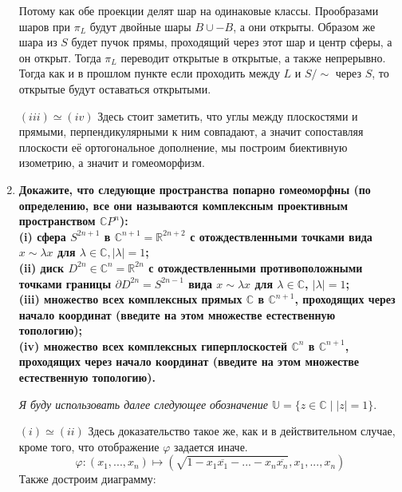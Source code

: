 \documentclass{article}
\begin{document}
\begin{enumerate}
        Потому как обе проекции делят шар на одинаковые классы. Прообразами
        шаров при $\pi_L$ будут двойные шары $B \cup -B$, а они
        открыты. Образом же шара из $S$ будет пучок прямы, проходящий через этот
        шар и центр сферы, а он открыт. Тогда $\pi_L$ переводит открытые в
        открытые, а также непрерывно. Тогда как и в прошлом пункте если
        проходить между $L$ и $S/\!\sim$ через $S$, то открытые будут оставаться
        открытыми.

        $(iii)\simeq(iv)$ Здесь стоит заметить, что углы между плоскостями и
        прямыми, перпендикулярными к ним совпадают, а значит сопоставляя
        плоскости её ортогональное дополнение, мы построим биективную изометрию,
        а значит и гомеоморфизм.

    \item \textbf{Докажите, что следующие пространства попарно гомеоморфны
        (по определению, все они называются комплексным проективным
        пространством $\mathbb{C}P^n$):\\
        (i) сфера $S^{2n+1}$ в $\mathbb{C}^{n+1} = \mathbb{R}^{2n+2}$ с
        отождествленными точками вида $x\sim\lambda x$ для $\lambda\in\mathbb{C}
        , |\lambda| = 1$;\\
        (ii) диск $D^{2n}\in\mathbb{C}^n = \mathbb{R}^{2n}$ с отождествленными
        противоположными точками границы $\partial D^{2n} = S^{2n−1}$
        вида $x\sim\lambda x$ для $\lambda\in\mathbb{C}$, $|\lambda|=1$;\\
        (iii) множество всех комплексных прямых $\mathbb{C}$ в
        $\mathbb{C}^{n+1}$, проходящих через начало координат (введите на этом
        множестве естественную топологию);\\
        (iv) множество всех комплексных гиперплоскостей $\mathbb{C}^n$ в
        $\mathbb{C}^{n+1}$, проходящих через начало координат (введите на этом
        множестве естественную топологию).}

        \textit{Я буду использовать далее следующее обозначение $\mathbb{U}=
        \{z\in\mathbb{C}\;|\;|z|=1\}.$}

        $(i)\simeq(ii)$ Здесь доказательство такое же, как и в действительном
        случае, кроме того, что отображение $\varphi$ задается иначе.
        \[\varphi:(x_1,...,x_n)\mapsto(\sqrt{1-x_1\overline{x_1}-...-x_n
        \overline{x_n}},x_1,...,x_n)\]
        Также достроим диаграмму:

        \begin{center}
        \end{center}


\end{enumerate}
\end{document}
